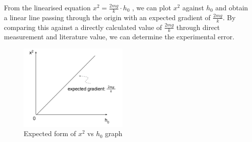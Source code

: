 From the linearised equation $x^2=\frac{2mg}{k}\cdot h_0$ , we can plot $x^2$ against $h_0$ and obtain a linear line passing through the origin with an expected gradient of $\frac{2mg}{k}$. By comparing this against a directly calculated value of $\frac{2mg}{k}$ through direct measurement and literature value, we can determine the experimental error.
\FloatBarrier
\begin{figure}[!htb]
    \begin{center}
        \includegraphics[width = 200px]{grad.png}
        \caption{Expected form of $x^2$ vs $h_0$ graph} \label{fig1}
    \end{center}
\end{figure}
\FloatBarrier